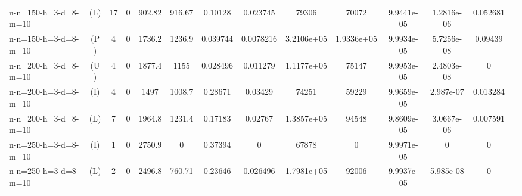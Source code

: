 \documentclass[landscape, a4paper]{article}
\newcommand{\Improved}{\ensuremath{\mathrm{I}}}
\newcommand{\Loose}{\ensuremath{\mathrm{L}}}
\newcommand{\Profit}{\ensuremath{\mathrm{P}}}
\newcommand{\Utility}{\ensuremath{\mathrm{U}}}
\begin{document}
\begin{center}
\begin{tabular}{lccccccccccccc}
n-n=150-h=3-d=8-m=10 & (\Loose) & 17 & 0 & 902.82 & 916.67 & 0.10128 & 0.023745 & 79306 & 70072 & 9.9441e-05 & 1.2816e-06 & 0.052681 & \\
n-n=150-h=3-d=8-m=10 & (\Profit) & 4 & 0 & 1736.2 & 1236.9 & 0.039744 & 0.0078216 & 3.2106e+05 & 1.9336e+05 & 9.9934e-05 & 5.7256e-08 & 0.09439 & \\
n-n=200-h=3-d=8-m=10 & (\Utility) & 4 & 0 & 1877.4 & 1155 & 0.028496 & 0.011279 & 1.1177e+05 & 75147 & 9.9953e-05 & 2.4803e-08 & 0 & \\
n-n=200-h=3-d=8-m=10 & (\Improved) & 4 & 0 & 1497 & 1008.7 & 0.28671 & 0.03429 & 74251 & 59229 & 9.9659e-05 & 2.987e-07 & 0.013284 & \\
n-n=200-h=3-d=8-m=10 & (\Loose) & 7 & 0 & 1964.8 & 1231.4 & 0.17183 & 0.02767 & 1.3857e+05 & 94548 & 9.8609e-05 & 3.0667e-06 & 0.007591 & \\
n-n=250-h=3-d=8-m=10 & (\Improved) & 1 & 0 & 2750.9 & 0 & 0.37394 & 0 & 67878 & 0 & 9.9971e-05 & 0 & 0 & \\
n-n=250-h=3-d=8-m=10 & (\Loose) & 2 & 0 & 2496.8 & 760.71 & 0.23646 & 0.026496 & 1.7981e+05 & 92006 & 9.9937e-05 & 5.985e-08 & 0 & \\
\end{tabular}
\end{center}
\end{document}

